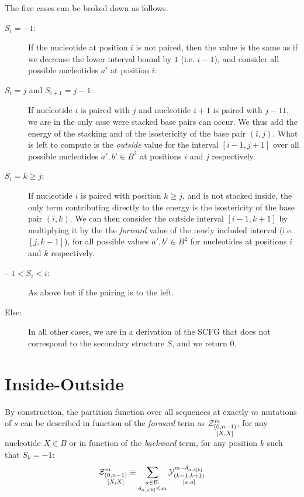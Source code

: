 The five cases can be broked down as follows.
\begin{description}
\item[$S_i=-1$:] If the nucleotide at position $i$ is not paired, then the value is the same
as if we decrease the lower interval bound by $1$ (i.e. $i-1$), and consider all possible
nucleotides $a'$ at position $i$.
\item[$S_{i}=j$ and $S_{i+1}=j-1$:] If nucleotide $i$ is paired with $j$ and nucleotide $i+1$ is
paired with $j-11$, we are in the only case were stacked base pairs can occur. We thus add
the energy of the stacking and of the isostericity of the base pair $(i,j)$. What is left
to compute is the \emph{outside} value for the interval $[i-1,j+1]$ over all possible nucleotides 
$a',b'\in B^2$ at positions $i$ and $j$ respectively.
\item[$S_{i}=k \geq j$:]If nucleotide $i$ is paired with position $k\geq j$, 
and is not stacked inside, the 
only term contributing directly to the energy is the isostericity of the base pair $(i,k)$. 
We can then consider the outside interval $[i-1,k+1]$ by multiplying it by the the \emph{forward}
value of the newly included interval (i.e. $[j,k-1]$), for 
all possible values $a',b'\in B^2$ for nucleotides at positions $i$ and $k$ respectively.
\item[$-1<S_{i}<i$:]As above but if the pairing is to the left.
\item[Else:] In all other cases, we are in a derivation of the SCFG that does not correspond to the 
secondary structure $S$, and we return $0$.


\end{description}

\section{Inside-Outside}
By construction, the partition function over all sequences at exactly $m$ mutations of $s$ can 
be described in function of the \emph{forward} term as $\Z{0,n-1}{m}{X,X}$,
 for any nucleotide $X\in B$ or
in function of the \emph{backward} term, for any position $k$ such that $S_k=-1$:
$$
	\Z{0,n-1}{m}{X,X}
	\equiv
	\sum_{\substack{a\in \B,\\ \Kron_{a,s[k]}\le m}}	
	\Y{k-1,k+1}{m-\Kron_{a,s[k]}}{a,a}
$$

